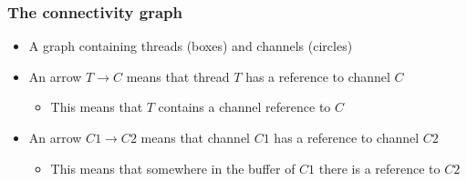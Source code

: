 \documentclass[aspectratio=169]{beamer}
\begin{document}
\begin{frame}[fragile]
  \frametitle{The connectivity graph}
  \begin{itemize}
    \item A graph containing threads (boxes) and channels (circles)
    \item An arrow $T \to C$ means that thread $T$ has a reference to channel $C$
      \begin{itemize}
        \item This means that $T$ contains a channel reference to $C$
      \end{itemize}
    \item An arrow $C1 \to C2$ means that channel $C1$ has a reference to channel $C2$
      \begin{itemize}
        \item This means that somewhere in the buffer of $C1$ there is a reference to $C2$
      \end{itemize}
  \end{itemize}
  \medskip

\end{frame}
\end{document}
